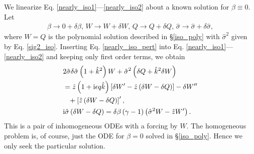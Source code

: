 We linearize Eq. \ref{nearly_iso1}---\ref{nearly_iso2} about a known
solution for $\beta\equiv0$. Let 
\begin{align}\label{nearly_iso_pert}
  \beta \to 0 + \delta\beta,\, W\to W+\delta W,\, Q \to Q+\delta
  Q,\,\hat{\sigma} \to \hat{\sigma} + \delta\hat{\sigma}, 
\end{align} 
where $W=Q$ is the polynomial solution described in \S\ref{iso_poly}
with $\hat{\sigma}^2$ given by Eq. \ref{sig2_iso}. Inserting
Eq. \ref{nearly_iso_pert} into
Eq. \ref{nearly_iso1}---\ref{nearly_iso2} and keeping only first order
terms, we obtain
\begin{align}
  &2\hat{\sigma}\delta\hat{\sigma}\left(1+\hat{k}^2\right)W +
  \hat{\sigma}^2 \left(\delta Q + \hat{k}^2\delta W\right)\notag\\
  &= \hat{z} \left(1+\mathrm{i}\epsilon q \hat{k}\right)\left[\delta W^\prime -
    \hat{z} \left(\delta W - 
      \delta Q\right)\right] - \delta W^{\prime\prime}\notag\\
  &\phantom{=} + \left[\hat{z} \left(\delta W -
     \delta Q\right)\right]^\prime,\label{nearly_iso3}\\
&\mathrm{i}\hat{\sigma} \left(\delta W - \delta Q\right) =
\delta\beta\left(\gamma-1\right)\left(\hat{\sigma}^2W - \hat{z}W^\prime\right).\label{nearly_iso4}
\end{align}
This is a pair of inhomogeneous ODEs with a forcing by $W$. The
homogeneous problem is, of course, just the ODE for $\beta=0$ solved
in \S\ref{iso_poly}. Hence we only seek the particular solution. 

